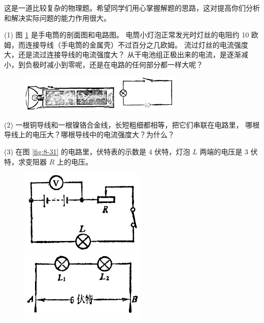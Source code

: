 这是一道比较复杂的物理题。希望同学们用心掌握解题的思路，这对提高你们分析和解决实际问题的能力作用很大。


\lianxi

(1) 图 \ref{fig:8-30} 是手电筒的剖面图和电路图。
 电筒小灯泡正常发光时灯丝的电阻约 10 欧姆，而连接导线（手电筒的金属壳）不过百分之几欧姆。
流过灯丝的电流强度大，还是流过连接导线的电流强度大？
 从干电池组正极出来的电流，是逐渐减小，到负极时减小到零呢，还是在电路的任何部分都一样大呢？

\begin{figure}[htbp]
    \centering
    \includegraphics[width=0.7\textwidth]{../pic/czwl2-ch8-30}
    \caption{}\label{fig:8-30}
\end{figure}

(2) 一根铜导线和一根镍铬合金线，长短粗细都相等，把它们串联在电路里，
哪根导线上的电压大？哪根导线中的电流强度大？为什么？

(3) 在图 \ref{fig:8-31} 的电路里，伏特表的示数是 4 伏特，灯泡 $L$ 两端的电压是 3 伏特，求变阻器 $R$ 上的电压。

\begin{figure}[htbp]
    \centering
    \begin{minipage}{7cm}
    \centering
    \includegraphics[width=6cm]{../pic/czwl2-ch8-31}
    \caption{}\label{fig:8-31}
    \end{minipage}
    \qquad
    \begin{minipage}{7cm}
    \centering
    \includegraphics[width=6cm]{../pic/czwl2-ch8-32}
    \caption{}\label{fig:8-32}
    \end{minipage}
\end{figure}

